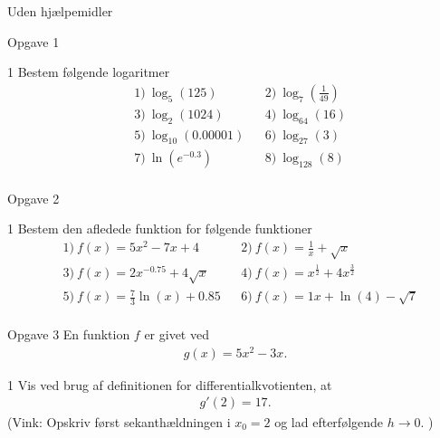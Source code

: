 \begin{center}
	\LARGE
	Uden hjælpemidler
\end{center}
\begin{opgavetekst}{Opgave 1}
\end{opgavetekst}
\begin{delopgave}{1}
	Bestem følgende logaritmer
	\begin{align*}
		&1) \ \log_{5}(125)& &2) \ \log_{7}\left(\frac{1}{49}\right)\\
		&3) \ \log_{2}(1024)& &4) \ \log_{64}(16)\\
		&5) \ \log_{10}(0.00001)& &6) \ \log_{27}(3)\\
		&7) \ \ln(e^{-0.3})& &8) \ \log_{128}(8)\\
	\end{align*}
\end{delopgave}
%
%
%
%
%
%
\begin{opgavetekst}{Opgave 2}
\end{opgavetekst}
\begin{delopgave}{1}
	Bestem den afledede funktion for følgende funktioner
	\begin{align*}
		&1) \ f(x) = 5x^2-7x+4 & &2) \ f(x) = \frac{1}{x} + \sqrt{x}\\
		&3) \ f(x) = 2x^{-0.75}+4\sqrt{x} & &4) \ f(x) = x^{\frac{1}{2}}+4x^{\frac{3}{2}}\\
		&5) \ f(x) = \frac{7}{3}\ln(x) + 0.85 & &6) \ f(x) = 1x + \ln(4) -\sqrt{7}\\
	\end{align*}
\end{delopgave}
%
%
%
%
%
\begin{opgavetekst}{Opgave 3}
	En funktion $f$ er givet ved
	\begin{align*}
		g(x) = 5x^2 - 3x.
	\end{align*}
\end{opgavetekst}
\begin{delopgave}{1}
	Vis ved brug af definitionen for differentialkvotienten, at 
	\begin{align*}
		g'(2) = 17.
	\end{align*}	 
	(Vink: Opskriv først sekanthældningen i $x_0  = 2$ og lad efterfølgende $h \to 0$. )
\end{delopgave}

